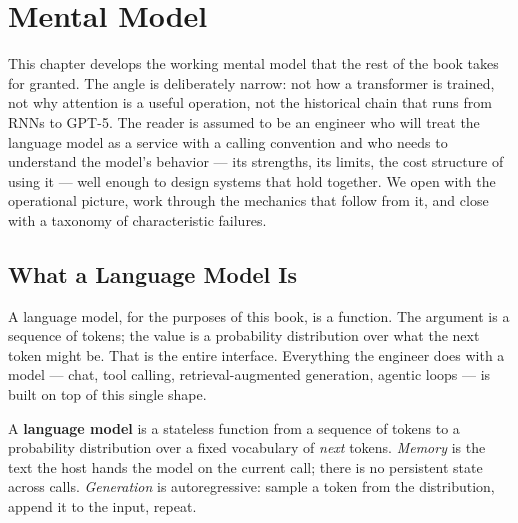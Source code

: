 
\chapter{Mental Model}
\label{ch:mental}


This chapter develops the working mental model that the rest of the
book takes for granted. The angle is deliberately narrow: not how a
transformer is trained, not why attention is a useful operation,
not the historical chain that runs from RNNs to GPT-5. The reader
is assumed to be an engineer who will treat the language model as
a service with a calling convention and who needs to understand
the model's behavior --- its strengths, its limits, the cost
structure of using it --- well enough to design systems that hold
together. We open with the operational picture, work through the
mechanics that follow from it, and close with a taxonomy of
characteristic failures.

\section{What a Language Model Is}
\label{sec:mental-what}

A language model, for the purposes of this book, is a function. The
argument is a sequence of tokens; the value is a probability
distribution over what the next token might be. That is the entire
interface. Everything the engineer does with a model --- chat,
tool calling, retrieval-augmented generation, agentic loops --- is
built on top of this single shape.

\begin{definitionbox}
A \textbf{language model} is a stateless function from a sequence
of tokens to a probability distribution over a fixed vocabulary
of \emph{next} tokens. \emph{Memory} is the text the host hands
the model on the current call; there is no persistent state across
calls. \emph{Generation} is autoregressive: sample a token from
the distribution, append it to the input, repeat.
\end{definitionbox}

